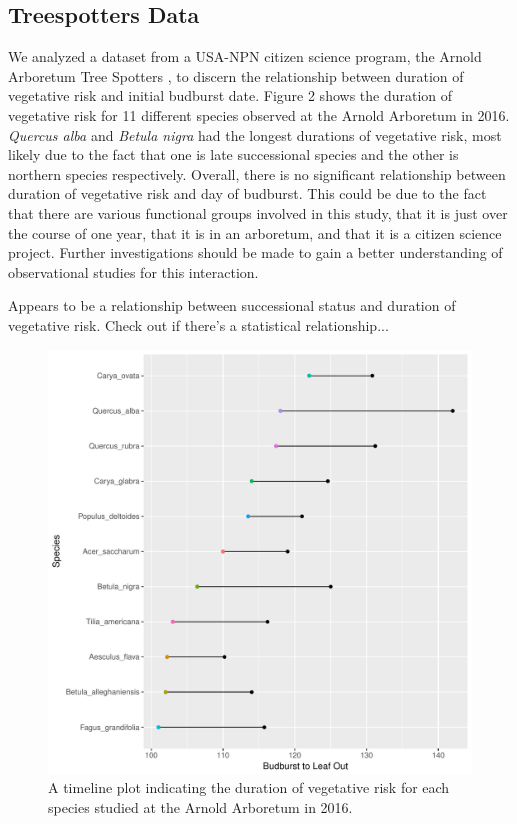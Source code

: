 \documentclass{article}\usepackage[]{graphicx}\usepackage[]{color}
\makeatletter
\def\maxwidth{ %
  \ifdim\Gin@nat@width>\linewidth
    \linewidth
  \else
    \Gin@nat@width
  \fi
}
\makeatother
\begin{document}
\subsection*{Treespotters Data}
We analyzed a dataset from a USA-NPN citizen science program, the Arnold Arboretum Tree Spotters %
, to discern the relationship between duration of vegetative risk and initial budburst date. Figure 2 shows the duration of vegetative risk for 11 different species observed at the Arnold Arboretum in 2016. \textit{Quercus alba} and \textit{Betula nigra} had the longest durations of vegetative risk, most likely due to the fact that one is late successional species and the other is northern species respectively. Overall, there is no significant relationship between duration of vegetative risk and day of budburst. This could be due to the fact that there are various functional groups involved in this study, that it is just over the course of one year, that it is in an arboretum, and that it is a citizen science project. Further investigations should be made to gain a better understanding of observational studies for this interaction. 


Appears to be a relationship between successional status and duration of vegetative risk. Check out if there's a statistical relationship...

\begin{figure}[H]
\includegraphics[width=\maxwidth]{figure/treespotters-1} \caption[A timeline plot indicating the duration of vegetative risk for each species studied at the Arnold Arboretum in 2016]{A timeline plot indicating the duration of vegetative risk for each species studied at the Arnold Arboretum in 2016.}\label{fig:treespotters}
\end{figure}
\end{document}
